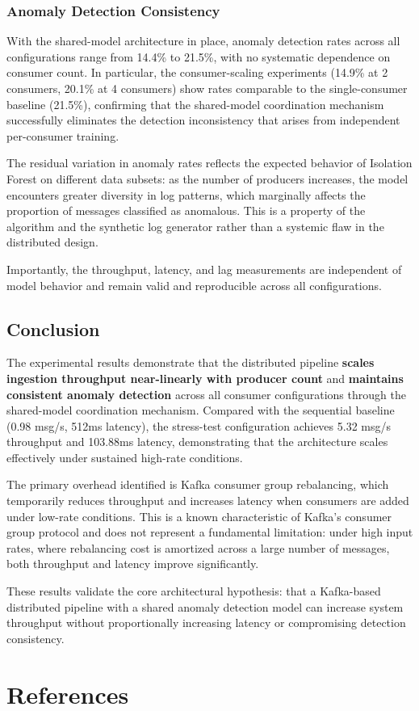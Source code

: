 \documentclass[12pt,a4paper]{report}
\begin{document}
\subsection{Anomaly Detection Consistency}

With the shared-model architecture in place, anomaly detection rates across all
configurations range from 14.4\% to 21.5\%, with no systematic dependence on consumer
count. In particular, the consumer-scaling experiments (14.9\% at 2 consumers, 20.1\%
at 4 consumers) show rates comparable to the single-consumer baseline (21.5\%), confirming
that the shared-model coordination mechanism successfully eliminates the detection
inconsistency that arises from independent per-consumer training.

The residual variation in anomaly rates reflects the expected behavior of Isolation
Forest on different data subsets: as the number of producers increases, the model
encounters greater diversity in log patterns, which marginally affects the proportion
of messages classified as anomalous. This is a property of the algorithm and the
synthetic log generator rather than a systemic flaw in the distributed design.

Importantly, the throughput, latency, and lag measurements are independent of model
behavior and remain valid and reproducible across all configurations.

\section{Conclusion}

The experimental results demonstrate that the distributed pipeline \textbf{scales
ingestion throughput near-linearly with producer count} and \textbf{maintains consistent
anomaly detection} across all consumer configurations through the shared-model
coordination mechanism. Compared with the sequential baseline (0.98 msg/s, 512ms
latency), the stress-test configuration achieves 5.32 msg/s throughput and 103.88ms
latency, demonstrating that the architecture scales effectively under sustained high-rate
conditions.

The primary overhead identified is Kafka consumer group rebalancing, which temporarily
reduces throughput and increases latency when consumers are added under low-rate
conditions. This is a known characteristic of Kafka's consumer group protocol and does
not represent a fundamental limitation: under high input rates, where rebalancing cost
is amortized across a large number of messages, both throughput and latency improve
significantly.

These results validate the core architectural hypothesis: that a Kafka-based distributed
pipeline with a shared anomaly detection model can increase system throughput without
proportionally increasing latency or compromising detection consistency.

\chapter{References}


\end{document}
